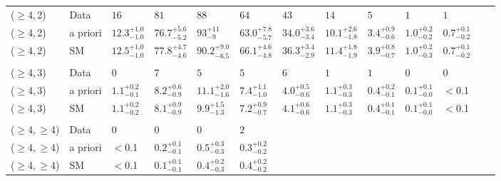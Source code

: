 \begin{table}[!t]
{\begin{tabular}{ lllllllllllll }
    ($\geq$4,\,2)
             & Data
             & $16$
             & $81$
             & $88$
             & $64$
             & $43$
             & $14$
             & $5$
             & $1$
             & $1$                                      \\
    ($\geq$4,\,2)
             & a priori
             & $12.3^{+1.0}_{-1.0}$
             & $76.7^{+5.6}_{-5.2}$
             & $93^{+11}_{-9}$
             & $63.0^{+7.8}_{-5.7}$
             & $34.0^{+3.6}_{-3.4}$
             & $10.1^{+2.6}_{-1.8}$
             & $3.4^{+0.9}_{-0.6}$
             & $1.0^{+0.2}_{-0.2}$
             & $0.7^{+0.1}_{-0.2}$                      \\
    ($\geq$4,\,2)
             & SM
             & $12.5^{+1.0}_{-1.0}$
             & $77.8^{+4.7}_{-4.6}$
             & $90.2^{+9.0}_{-6.5}$
             & $66.1^{+4.6}_{-4.8}$
             & $36.3^{+3.4}_{-2.9}$
             & $11.4^{+1.8}_{-1.9}$
             & $3.9^{+0.8}_{-0.7}$
             & $1.0^{+0.2}_{-0.3}$
             & $0.7^{+0.1}_{-0.2}$                      \\\\[-2ex]
    ($\geq$4,\,3)
             & Data
             & $0$
             & $7$
             & $5$
             & $5$
             & $6$
             & $1$
             & $1$
             & $0$
             & $0$                                      \\
    ($\geq$4,\,3)
             & a priori
             & $1.1^{+0.2}_{-0.1}$
             & $8.2^{+0.6}_{-0.9}$
             & $11.1^{+2.0}_{-1.6}$
             & $7.4^{+1.1}_{-1.0}$
             & $4.0^{+0.5}_{-0.6}$
             & $1.1^{+0.3}_{-0.3}$
             & $0.4^{+0.2}_{-0.1}$
             & $0.1^{+0.1}_{-0.0}$
             & $<$0.1                                   \\
    ($\geq$4,\,3)
             & SM
             & $1.1^{+0.2}_{-0.2}$
             & $8.1^{+0.9}_{-0.9}$
             & $9.9^{+1.5}_{-1.3}$
             & $7.2^{+0.9}_{-0.7}$
             & $4.1^{+0.6}_{-0.6}$
             & $1.1^{+0.3}_{-0.3}$
             & $0.4^{+0.1}_{-0.1}$
             & $0.1^{+0.1}_{-0.0}$
             & $<$0.1                                   \\\\[-2ex]
    ($\geq$4,\,$\geq$4)
             & Data
             & $0$
             & $0$
             & $0$
             & $2$                                      \\
    ($\geq$4,\,$\geq$4)
             & a priori 
             & $<$0.1
             & $0.2^{+0.1}_{-0.1}$
             & $0.5^{+0.3}_{-0.3}$
             & $0.3^{+0.2}_{-0.2}$                      \\
    ($\geq$4,\,$\geq$4)
             & SM
             & $<$0.1
             & $0.1^{+0.1}_{-0.1}$
             & $0.4^{+0.2}_{-0.3}$
             & $0.4^{+0.2}_{-0.2}$                      \\

    \hline
  \end{tabular}
  }
\end{table}

